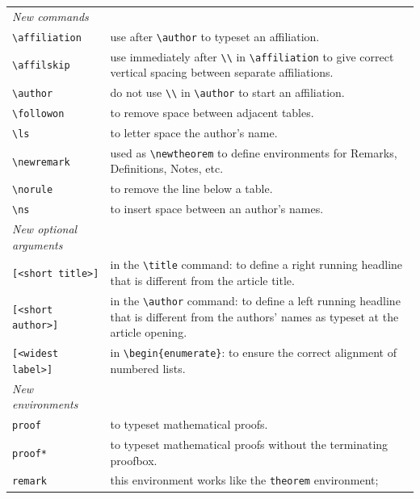 \begin{tabular}{lp{8cm}}
{\em New commands}    & \\ 
\verb"\affiliation"   & use after \verb"\author" to typeset an affiliation.\\
\verb"\affilskip"     & use immediately after \verb"\\" in
                        \verb"\affiliation" to
                        give correct vertical spacing between separate
                        affiliations. \\
\verb"\author"        & do not use \verb"\\" in \verb"\author" to
                        start an affiliation. \\
\verb"\followon"      & to remove space between adjacent tables.\\
\verb"\ls"            & to letter space the author's name. \\
\verb"\newremark"     & used as \verb"\newtheorem" to define environments
                        for Remarks, Definitions, Notes, etc. \\
\verb"\norule"        & to remove the line below a table.\\
\verb"\ns"            & to insert space between an author's names.  
                                                          \\[6.5pt]
{\em New optional arguments} & \\
\verb"[<short title>]" & in the \verb"\title" command: to define a right
                         running headline that is different from the article
                         title. \\
\verb"[<short author>]" & in the \verb"\author" command: to define a left
                          running headline that is different from the
                          authors' names as typeset at the article opening.\\
\verb"[<widest label>]" & in \verb"\begin{enumerate}": to ensure the correct
                          alignment of numbered lists.\\[6.5pt]
{\em New environments}  & \\
\verb"proof"            & to typeset mathematical proofs. \\
\verb"proof*"           & to typeset mathematical proofs without the
                          terminating proofbox. \\
\verb"remark"           & this environment works like the \verb"theorem"
                          environment;

\end{tabular}
